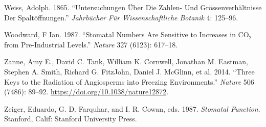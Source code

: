\documentclass[
  12pt,
]{article}
\newlength{\cslhangindent}
\newlength{\cslentryspacingunit} %
\newenvironment{CSLReferences}[2] %
 {%
  \setlength{\parindent}{0pt}
  \ifodd #1
  \let\oldpar\par
  \def\par{\hangindent=\cslhangindent\oldpar}
  \fi
  \setlength{\parskip}{#2\cslentryspacingunit}
 }%
 {}
\begin{document}
\begin{CSLReferences}{1}{0}
\leavevmode{}%
Weiss, Adolph. 1865. {``Untersuchungen Über Die {Zahlen}- Und {Grössenverhältnisse} Der {Spaltöffnungen}.''} \emph{Jahrbücher Für Wissenschaftliche Botanik} 4: 125--96.

\leavevmode{}%
Woodward, F Ian. 1987. {``Stomatal Numbers Are Sensitive to Increases in {CO}\(_{\textrm{2}}\) from Pre-Industrial Levels.''} \emph{Nature} 327 (6123): 617--18.

\leavevmode{}%
Zanne, Amy E., David C. Tank, William K. Cornwell, Jonathan M. Eastman, Stephen A. Smith, Richard G. FitzJohn, Daniel J. McGlinn, et al. 2014. {``Three Keys to the Radiation of Angiosperms into Freezing Environments.''} \emph{Nature} 506 (7486): 89--92. \url{https://doi.org/10.1038/nature12872}.

\leavevmode{}%
Zeiger, Eduardo, G. D. Farquhar, and I. R. Cowan, eds. 1987. \emph{Stomatal Function}. Stanford, Calif: Stanford University Press.

\end{CSLReferences}
\end{document}
